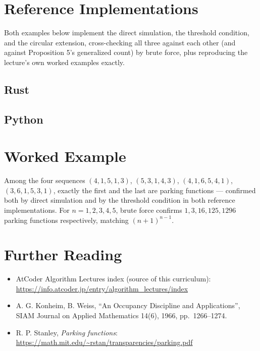 \documentclass[11pt]{article}
\begin{document}
\section{Reference Implementations}
Both examples below implement the direct simulation, the threshold
condition, and the circular extension, cross-checking all three against
each other (and against Proposition 5's generalized count) by brute
force, plus reproducing the lecture's own worked examples exactly.

\codenote
\subsection{Rust}

\subsection{Python}

\section{Worked Example}
\begin{examplebox}
Among the four sequences $(4,1,5,1,3)$, $(5,3,1,4,3)$, $(4,1,6,5,4,1)$,
$(3,6,1,5,3,1)$, exactly the first and the last are parking functions ---
confirmed both by direct simulation and by the threshold condition in
both reference implementations. For $n=1,2,3,4,5$, brute force confirms
$1, 3, 16, 125, 1296$ parking functions respectively, matching
$(n+1)^{n-1}$.
\end{examplebox}

\section{Further Reading}
\begin{itemize}[leftmargin=1.5em]
  \item AtCoder Algorithm Lectures index (source of this curriculum):
        \url{https://info.atcoder.jp/entry/algorithm_lectures/index}
  \item A. G. Konheim, B. Weiss, ``An Occupancy Discipline and
        Applications'', SIAM Journal on Applied Mathematics 14(6), 1966,
        pp.\ 1266--1274.
  \item R. P. Stanley, \emph{Parking functions}:
        \url{https://math.mit.edu/~rstan/transparencies/parking.pdf}
\end{itemize}
\end{document}
